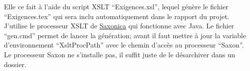 Elle ce fait à l'aide du script XSLT \enquote{Exigences.xsl}, lequel génère le
fichier \enquote{Exigences.tex} qui sera inclu automatiquement dans le rapport
du projet. J'utilise le processeur XSLT de
\href{http://www.saxonica.com/download/opensource.xml}{Saxonica} qui
fonctionne avec Java. Le fichier \enquote{gen.cmd} permet de lancer la
génération; avant il faut mettre à jour la variable d'environnement
\enquote{XsltProcPath} avec le chemin d'accès au processeur \enquote{Saxon}. Le
processeur Saxon ne s'installe pas, il suffit juste de le désarchiver
dans un dossier.
